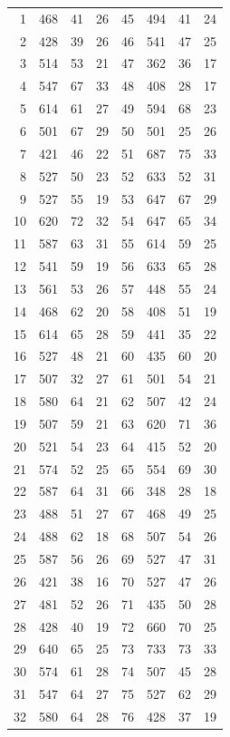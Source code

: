\begin{mvtable}
\begin{longtable}{rrrrrrrr}
1 & 468 & 41 & 26 & 45 & 494 & 41 & 24\\
2 & 428 & 39 & 26 & 46 & 541 & 47 & 25\\
3 & 514 & 53 & 21 & 47 & 362 & 36 & 17\\
4 & 547 & 67 & 33 & 48 & 408 & 28 & 17\\
5 & 614 & 61 & 27 & 49 & 594 & 68 & 23\\
6 & 501 & 67 & 29 & 50 & 501 & 25 & 26\\
7 & 421 & 46 & 22 & 51 & 687 & 75 & 33\\
8 & 527 & 50 & 23 & 52 & 633 & 52 & 31\\
9 & 527 & 55 & 19 & 53 & 647 & 67 & 29\\
10 & 620 & 72 & 32 & 54 & 647 & 65 & 34\\
11 & 587 & 63 & 31 & 55 & 614 & 59 & 25\\
12 & 541 & 59 & 19 & 56 & 633 & 65 & 28\\
13 & 561 & 53 & 26 & 57 & 448 & 55 & 24\\
14 & 468 & 62 & 20 & 58 & 408 & 51 & 19\\
15 & 614 & 65 & 28 & 59 & 441 & 35 & 22\\
16 & 527 & 48 & 21 & 60 & 435 & 60 & 20\\
17 & 507 & 32 & 27 & 61 & 501 & 54 & 21\\
18 & 580 & 64 & 21 & 62 & 507 & 42 & 24\\
19 & 507 & 59 & 21 & 63 & 620 & 71 & 36\\
20 & 521 & 54 & 23 & 64 & 415 & 52 & 20\\
21 & 574 & 52 & 25 & 65 & 554 & 69 & 30\\
22 & 587 & 64 & 31 & 66 & 348 & 28 & 18\\
23 & 488 & 51 & 27 & 67 & 468 & 49 & 25\\
24 & 488 & 62 & 18 & 68 & 507 & 54 & 26\\
25 & 587 & 56 & 26 & 69 & 527 & 47 & 31\\
26 & 421 & 38 & 16 & 70 & 527 & 47 & 26\\
27 & 481 & 52 & 26 & 71 & 435 & 50 & 28\\
28 & 428 & 40 & 19 & 72 & 660 & 70 & 25\\
29 & 640 & 65 & 25 & 73 & 733 & 73 & 33\\
30 & 574 & 61 & 28 & 74 & 507 & 45 & 28\\
31 & 547 & 64 & 27 & 75 & 527 & 62 & 29\\
32 & 580 & 64 & 28 & 76 & 428 & 37 & 19\\

\end{longtable}
\end{mvtable}
